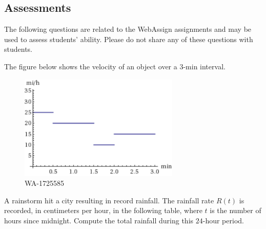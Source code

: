 \documentclass[12pt,addpoints, answers, fleqn]{exam}
\begin{document}
\begin{teacher}
\subsection{Assessments}
The following questions are related to the WebAssign assignments and may be used to assess students' ability. Please do not share any of these questions with students.
\begin{questions}		
\question 	%

The figure below shows the velocity of an object over a $3$-min interval.
\begin{figure}[htbp] %
   \centering
   \includegraphics[width=3in]{./graphics/1725585.pdf} 
   \caption{WA-1725585}
   \label{fig:1725585}
\end{figure}



\question 	%

A rainstorm hit a city resulting in record rainfall. The rainfall rate $R\left(t\right)$ is recorded, in centimeters per hour, in the following table, where $t$ is the number of hours since midnight. Compute the total rainfall during this $24$-hour period.


\end{questions}
\end{teacher}
\end{document}
